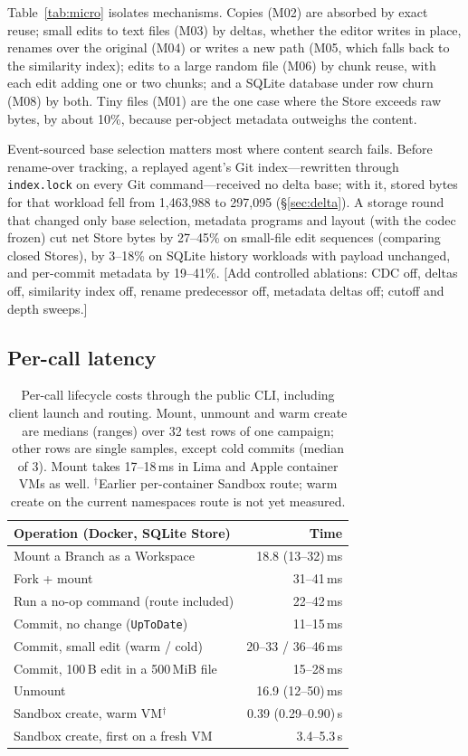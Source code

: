 \documentclass[letterpaper,twocolumn,10pt]{article}
\newif\ifdraft\drafttrue
\newcommand{\dnote}[1]{\ifdraft\textcolor{red!70!black}{\textsf{\small[#1]}}\fi}
\newcommand{\ws}{Workspace}
\begin{document}
Table~\ref{tab:micro} isolates mechanisms. Copies (M02) are absorbed by
exact reuse; small edits to text files (M03) by deltas, whether the editor
writes in place, renames over the original (M04) or writes a new path (M05,
which falls back to the similarity index); edits to a large random file
(M06) by chunk reuse, with each edit adding one or two chunks; and a SQLite
database under row churn (M08) by both. Tiny files (M01) are the one case
where the Store exceeds raw bytes, by about 10\%, because per-object
metadata outweighs the content.

Event-sourced base selection matters most where content search fails. Before
rename-over tracking, a replayed agent's Git index---rewritten through
\texttt{index.lock} on every Git command---received no delta base; with it,
stored bytes for that workload fell from 1,463,988 to 297,095 (\S\ref{sec:delta}).
A storage round that changed only base selection, metadata programs and
layout (with the codec frozen) cut net Store bytes by 27--45\% on
small-file edit sequences (comparing closed Stores), by 3--18\% on SQLite
history workloads with payload unchanged, and per-commit metadata by
19--41\%. \dnote{Add controlled ablations: CDC off, deltas off, similarity
index off, rename predecessor off, metadata deltas off; cutoff and depth
sweeps.}

\subsection{Per-call latency}
\label{sec:eval-latency}

\begin{table}[t]
\centering
\small
\begin{tabular}{l r}
\toprule
Operation (Docker, SQLite Store) & Time \\
\midrule
Mount a Branch as a \ws{}              & 18.8 (13--32)\,ms \\
Fork + mount                            & 31--41\,ms \\
Run a no-op command (route included)    & 22--42\,ms \\
Commit, no change (\texttt{UpToDate})   & 11--15\,ms \\
Commit, small edit (warm / cold)        & 20--33 / 36--46\,ms \\
Commit, 100\,B edit in a 500\,MiB file  & 15--28\,ms \\
Unmount                                 & 16.9 (12--50)\,ms \\
\midrule
Sandbox create, warm VM$^\dagger$       & 0.39 (0.29--0.90)\,s \\
Sandbox create, first on a fresh VM     & 3.4--5.3\,s \\
\bottomrule
\end{tabular}
\caption{Per-call lifecycle costs through the public CLI, including client
launch and routing. Mount, unmount and warm create are medians (ranges) over
32 test rows of one campaign; other rows are single samples, except cold
commits (median of 3). Mount takes 17--18\,ms in Lima and Apple container
VMs as well. $^\dagger$Earlier per-container Sandbox route; warm create on
the current namespaces route is not yet measured.}
\label{tab:lifecycle}
\end{table}
\end{document}
